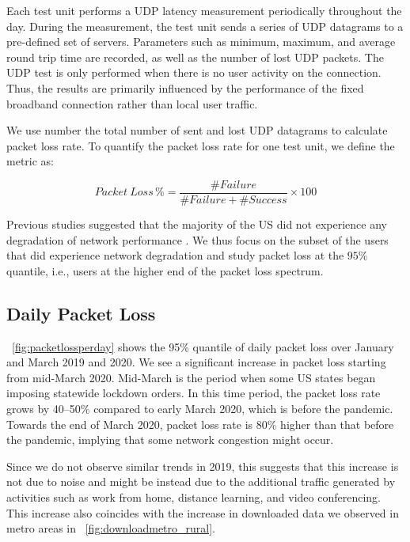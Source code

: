 Each test unit performs a UDP latency measurement periodically throughout the day. During the measurement, the test unit sends a series of UDP datagrams to a pre-defined set of servers. Parameters such as minimum, maximum, and average round  trip time are recorded, as well as the number of lost UDP packets. The UDP test is only performed when there is no user activity on the connection. Thus, the results are primarily influenced by the performance of the fixed broadband connection rather than local user traffic.

We use number the total number of sent and lost UDP datagrams to calculate packet loss rate. To quantify the packet loss rate for one test unit, we define the metric as:

\begin{equation}
    Packet \ Loss\, \% = \frac{\#Failure }{\#Failure + \#Success} \times 100
\end{equation}

Previous studies suggested that the majority of the US did not experience any degradation of network performance \cite{kovacs}. We thus focus on the subset of the users that did experience network degradation and study packet loss at the $95\%$ quantile, i.e., users at the higher end of the packet loss spectrum.

\subsection{Daily Packet Loss}

\figurename~\ref{fig:packetlossperday} shows the 95\% quantile of daily packet loss over January and March 2019 and 2020. We see a significant increase in packet loss starting from mid-March 2020. Mid-March is the period when some US states began imposing statewide lockdown orders. In this time period, the packet loss rate grows by 40--50\% compared to early March 2020, which is before the pandemic. Towards the end of March 2020, packet loss rate is 80\% higher than that before the pandemic, implying that some network congestion might occur.

Since we do not observe similar trends in 2019, this suggests that this increase is not due to noise and might be instead due to the additional traffic generated by activities such as work from home, distance learning, and video conferencing. This increase also coincides with the increase in downloaded data we observed in metro areas in \figurename~\ref{fig:downloadmetro_rural}.


